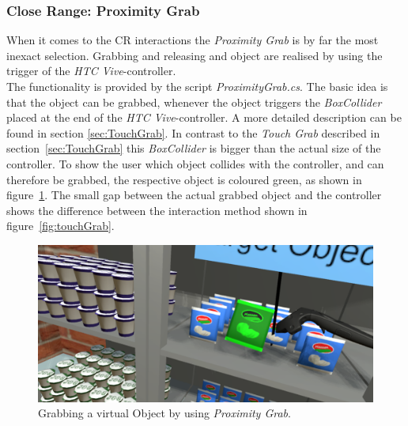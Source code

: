 \subsubsection{Close Range: Proximity Grab} \label{sec:ProximityGrab}
When it comes to the CR interactions the \textit{Proximity Grab} is by far the most inexact selection. Grabbing and releasing and object are realised by using the trigger of the \textit{HTC Vive}-controller.  \\
The functionality is provided by the script \textit{ProximityGrab.cs}. The basic idea is that the object can be grabbed, whenever the object triggers the \textit{BoxCollider} \cite{website:BoxCollider} placed at the end of the \textit{HTC Vive}-controller. A more detailed description can be found in section \ref{sec:TouchGrab}. In contrast to the \textit{Touch Grab} described in section~\ref{sec:TouchGrab} this \textit{BoxCollider} is bigger than the actual size of the controller. To show the user which object collides with the controller, and can therefore be grabbed, the respective object is coloured green, as shown in figure~\ref{fig:proximityGrab}. The small gap between the actual grabbed object and the controller shows the difference between the interaction method shown in figure~\ref{fig:touchGrab}.

\begin{figure}[H] 
	\center 
	\includegraphics[width=12cm]{Images/ProximityGrab.PNG}			
	\caption[Grabbing a virtual Object by using \textit{Proximity Grab}.]{Grabbing a virtual Object by using \textit{Proximity Grab}.}
	\label{fig:proximityGrab}
\end{figure}


